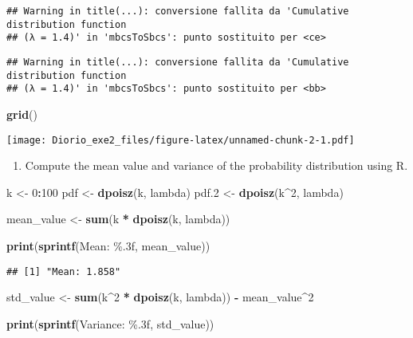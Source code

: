 \documentclass[
]{article}
\newenvironment{Shaded}{\begin{snugshade}}{\end{snugshade}}
\newcommand{\DecValTok}[1]{\textcolor[rgb]{0.00,0.00,0.81}{#1}}
\newcommand{\FloatTok}[1]{\textcolor[rgb]{0.00,0.00,0.81}{#1}}
\newcommand{\FunctionTok}[1]{\textcolor[rgb]{0.13,0.29,0.53}{\textbf{#1}}}
\newcommand{\NormalTok}[1]{#1}
\newcommand{\OtherTok}[1]{\textcolor[rgb]{0.56,0.35,0.01}{#1}}
\newcommand{\SpecialCharTok}[1]{\textcolor[rgb]{0.81,0.36,0.00}{\textbf{#1}}}
\newcommand{\StringTok}[1]{\textcolor[rgb]{0.31,0.60,0.02}{#1}}
\providecommand{\tightlist}{%
  \setlength{\itemsep}{0pt}\setlength{\parskip}{0pt}}
\begin{document}
\begin{verbatim}
## Warning in title(...): conversione fallita da 'Cumulative distribution function
## (λ = 1.4)' in 'mbcsToSbcs': punto sostituito per <ce>
\end{verbatim}

\begin{verbatim}
## Warning in title(...): conversione fallita da 'Cumulative distribution function
## (λ = 1.4)' in 'mbcsToSbcs': punto sostituito per <bb>
\end{verbatim}

\begin{Shaded}
\begin{Highlighting}[]
\FunctionTok{grid}\NormalTok{()}
\end{Highlighting}
\end{Shaded}

\texttt{[image: Diorio\_exe2\_files/figure-latex/unnamed-chunk-2-1.pdf]}

\begin{enumerate}
\def\labelenumi{\arabic{enumi})}
\setcounter{enumi}{2}
\tightlist
\item
  Compute the mean value and variance of the probability distribution
  using R.
\end{enumerate}

\begin{Shaded}
\begin{Highlighting}[]
\NormalTok{k }\OtherTok{\textless{}{-}} \DecValTok{0}\SpecialCharTok{:}\DecValTok{100}
\NormalTok{pdf }\OtherTok{\textless{}{-}} \FunctionTok{dpoisz}\NormalTok{(k, lambda)}
\NormalTok{pdf}\FloatTok{.2} \OtherTok{\textless{}{-}} \FunctionTok{dpoisz}\NormalTok{(k}\SpecialCharTok{\^{}}\DecValTok{2}\NormalTok{, lambda)}

\NormalTok{mean\_value }\OtherTok{\textless{}{-}} \FunctionTok{sum}\NormalTok{(k }\SpecialCharTok{*} \FunctionTok{dpoisz}\NormalTok{(k, lambda))}


\FunctionTok{print}\NormalTok{(}\FunctionTok{sprintf}\NormalTok{(}\StringTok{\textquotesingle{}Mean: \%.3f\textquotesingle{}}\NormalTok{, mean\_value))}
\end{Highlighting}
\end{Shaded}

\begin{verbatim}
## [1] "Mean: 1.858"
\end{verbatim}

\begin{Shaded}
\begin{Highlighting}[]
\NormalTok{std\_value }\OtherTok{\textless{}{-}} \FunctionTok{sum}\NormalTok{(k}\SpecialCharTok{\^{}}\DecValTok{2} \SpecialCharTok{*} \FunctionTok{dpoisz}\NormalTok{(k, lambda)) }\SpecialCharTok{{-}}\NormalTok{ mean\_value}\SpecialCharTok{\^{}}\DecValTok{2}


\FunctionTok{print}\NormalTok{(}\FunctionTok{sprintf}\NormalTok{(}\StringTok{\textquotesingle{}Variance: \%.3f\textquotesingle{}}\NormalTok{, std\_value))}
\end{Highlighting}
\end{Shaded}
\end{document}
